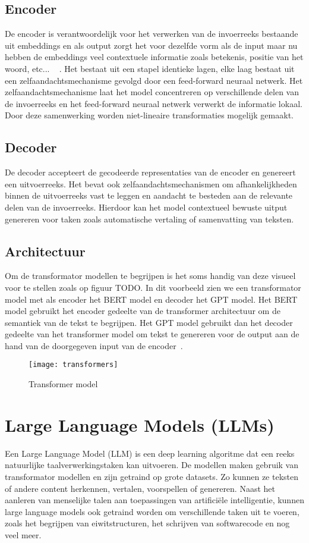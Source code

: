 \subsection{Encoder} \label{ssec:Encoder}
De encoder is verantwoordelijk voor het verwerken van de invoerreeks bestaande uit embeddings en als output zorgt het voor dezelfde vorm als de input maar nu hebben de embeddings veel contextuele informatie zoals betekenis, positie van het woord, etc... ~\autocite{Suresh2022} . Het bestaat uit een stapel identieke lagen, elke laag bestaat uit een zelfaandachtsmechanisme gevolgd door een feed-forward neuraal netwerk. Het zelfaandachtsmechanisme laat het model concentreren op verschillende delen van de invoerreeks en het feed-forward neuraal netwerk verwerkt de informatie lokaal. Door deze samenwerking worden niet-lineaire transformaties mogelijk gemaakt. 

\subsection{Decoder}
De decoder accepteert de gecodeerde representaties van de encoder en genereert een uitvoerreeks. Het bevat ook zelfaandachtsmechanismen om afhankelijkheden binnen de uitvoerreeks vast te leggen en aandacht te besteden aan de relevante delen van de invoerreeks. Hierdoor kan het model contextueel bewuste uitput genereren voor taken zoals automatische vertaling of samenvatting van teksten. 

\subsection{Architectuur}
Om de transformator modellen te begrijpen is het soms handig van deze visueel voor te stellen zoals op figuur {TODO}. In dit voorbeeld zien we een transformator model met als encoder het BERT model en decoder het GPT model. Het BERT model gebruikt het encoder gedeelte van de transformer architectuur om de semantiek van de tekst te begrijpen. Het GPT model gebruikt dan het decoder gedeelte van het transformer model om tekst te genereren voor de output aan de hand van de doorgegeven input van de encoder~\autocite{Heidloff2023}. 


\begin{figure}
    \centering
    \texttt{[image: transformers]}
    \caption{Transformer model}
    \label{fig:transformer}
\end{figure}


\section{Large Language Models (LLMs)}
Een Large Language Model (LLM) is een deep learning algoritme dat een reeks natuurlijke taalverwerkingstaken kan uitvoeren.  De modellen maken gebruik van transformator modellen en zijn getraind op grote datasets. Zo kunnen ze teksten of andere content herkennen, vertalen, voorspellen of genereren. Naast het aanleren van menselijke talen aan toepassingen van artificiële intelligentie, kunnen large language models ook getraind worden om verschillende taken uit te voeren, zoals het begrijpen van eiwitstructuren, het schrijven van softwarecode en nog veel meer. 

